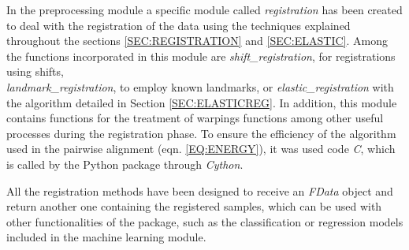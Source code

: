 
In the preprocessing module a specific module called \textit{registration} has
been created to deal with the registration of the data using the techniques
explained throughout the sections \ref{SEC:REGISTRATION} and \ref{SEC:ELASTIC}.
Among the functions incorporated in this module are \textit{shift\_registration},
for registrations using shifts,\\ \textit{landmark\_registration},
to employ known landmarks, or \textit{elastic\_registration} with the algorithm
detailed in Section \ref{SEC:ELASTICREG}.
In addition, this module contains functions for the treatment of
warpings functions among other useful processes during the registration phase.
To ensure the efficiency of the algorithm used in the pairwise alignment
(eqn. \ref{EQ:ENERGY}), it was used code \textit{C},
which is called by the Python package through \textit{Cython}.

All the registration methods have been designed to receive an \textit{FData} object and
return another one containing the registered samples, which can be used with
other functionalities of the package, such as the classification or regression
models included in the machine learning module.

